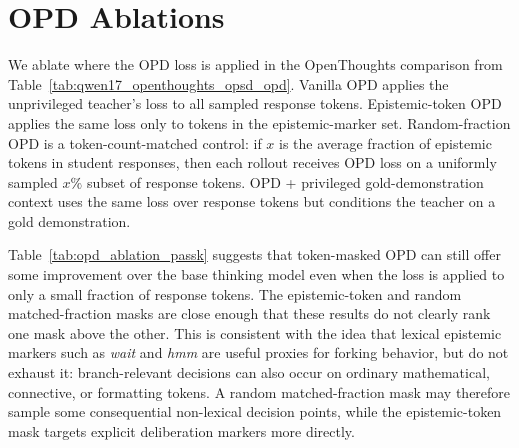 \section{OPD Ablations}
\label{app:opd-ablations}

We ablate where the OPD loss is applied in the \qwenonesevenb{} OpenThoughts
comparison from Table~\ref{tab:qwen17_openthoughts_opsd_opd}. Vanilla OPD
applies the unprivileged teacher's loss to all sampled response tokens.
Epistemic-token OPD applies the same loss only to tokens in the
epistemic-marker set. Random-fraction OPD is a token-count-matched control: if
$x$ is the average fraction of epistemic tokens in student responses, then each
rollout receives OPD loss on a uniformly sampled $x\%$ subset of response
tokens. OPD + privileged gold-demonstration context uses the same loss over
response tokens but conditions the teacher on a gold demonstration.



Table~\ref{tab:opd_ablation_passk} suggests that token-masked OPD can still
offer some improvement over the base thinking model even when the loss is
applied to only a small fraction of response tokens. The epistemic-token and
random matched-fraction masks are close enough that these results do not clearly
rank one mask above the other. This is consistent with the idea that lexical
epistemic markers such as \textit{wait} and \textit{hmm} are useful proxies for
forking behavior, but do not exhaust it: branch-relevant decisions can also
occur on ordinary mathematical, connective, or formatting tokens. A random
matched-fraction mask may therefore sample some consequential non-lexical
decision points, while the epistemic-token mask targets explicit deliberation
markers more directly.






